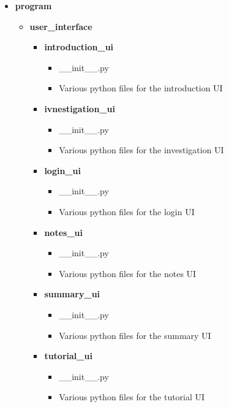 \documentclass[12pt]{article}
\begin{document}
\begin{itemize}
    \item \textbf{program}
    \begin{itemize}
        \item \textbf{user\_interface}
        \begin{itemize}
            \item \textbf{introduction\_ui}
            \begin{itemize}
                \item \_\_init\_\_.py
                \item Various python files for the introduction UI
            \end{itemize}
            \item \textbf{ivnestigation\_ui}
            \begin{itemize}
                \item \_\_init\_\_.py
                \item Various python files for the investigation UI
            \end{itemize}
            \item \textbf{login\_ui}
            \begin{itemize}
                \item \_\_init\_\_.py
                \item Various python files for the login UI
            \end{itemize}
            \item \textbf{notes\_ui}
            \begin{itemize}
                \item \_\_init\_\_.py
                \item Various python files for the notes UI
            \end{itemize}
            \item \textbf{summary\_ui}
            \begin{itemize}
                \item \_\_init\_\_.py
                \item Various python files for the summary UI
            \end{itemize}
            \item \textbf{tutorial\_ui}
            \begin{itemize}
                \item \_\_init\_\_.py
                \item Various python files for the tutorial UI

\end{itemize}
\end{itemize}
\end{itemize}
\end{itemize}
\end{document}
